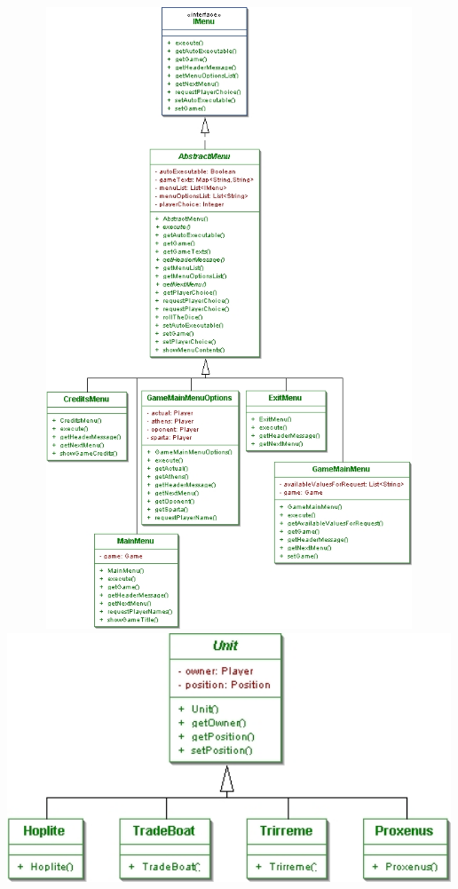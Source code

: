 \documentclass[11 pt]{book}
\begin{document}
\begin{center}
		    \includegraphics[width=500px, height=700px]{design-uml/iteration7/textui.jpg}
		    \includegraphics[width=500px]{design-uml/iteration7/units.jpg}

\end{center}
\end{document}
